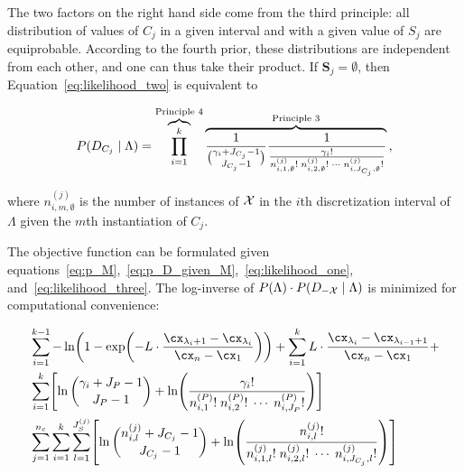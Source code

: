 The two factors on the right hand side come from the third principle: all distribution of values of $C_j$ in a given interval and with a given value of $S_j$ are equiprobable.
According to the fourth prior, these distributions are independent from each other, and one can thus take their product.
If $\bm{S}_j = \emptyset$, then Equation~\ref{eq:likelihood_two} is equivalent to

\begin{equation}
  \label{eq:likelihood_three}
  P(D_{C_j} \mid \Lambda) =
  \overbrace{\prod_{i=1}^{k}}^{\text{Principle 4}}
  \overbrace{{
    {1}\over{
      {\gamma_i + J_{C_j} - 1}\choose{J_{C_j}-1}}
    }
    {{1}\over{
      {{\gamma_i}!} \over {
        {n^{(j)}_{i,1,\emptyset}!} \; {n^{(j)}_{i,2,\emptyset}!} \; \cdots \; {n^{(j)}_{i,J_{C_j},\emptyset} !}
      }
    }
  }}^{\text{Principle 3}}
  \text{,}
\end{equation}

\noindent
where $n^{(j)}_{i,m,\emptyset}$ is the number of instances of $\mathcal{X}$ in the $i$th discretization interval of $\Lambda$ given the $m$th instantiation of $C_j$.

The objective function can be formulated given equations~\ref{eq:p_M},~\ref{eq:p_D_given_M},~\ref{eq:likelihood_one}, and~\ref{eq:likelihood_three}.
The log-inverse of $P(\Lambda) \cdot P(D_{-\mathcal{X}} \mid \Lambda)$ is minimized for computational convenience:

\begin{equation}
\label{eq:opt_prob}
\begin{aligned}
  & \sum_{i=1}^{k-1}
   - \ln
    \paren{
      1 - \exp
      \paren{
        - L \cdot  \frac{
                         \cx_{\lambda_i +1} - \cx_{\lambda_i}
                       }{
                         \cx_n - \cx_1
                        }
      }
    }
      + \sum_{i=1}^{k}
      L \cdot \frac{\cx_{\lambda_{i}} - \cx_{\lambda_{i-1} + 1}}{\cx_n - \cx_1} + \\
  & \sum_{i=1}^{k} \brock{
  \ln{{\gamma_i + J_P - 1}\choose{J_P - 1}}
  +{ \ln \paren{
        \frac{
          {\gamma_i}!
        }{
          {n^{({P})}_{i,1}}! \; {n^{({P})}_{i,2}}! \; \cdots \; {n^{({P})}_{i,J_P}}!
        }
      }}
  } \\
  & \sum_{j=1}^{n_c} \sum_{i=1}^k \sum_{l=1}^{J^{(j)}_S} \brock{
  { \ln
          {{n^{(j)}_{i,l} + J_{C_j} - 1}\choose{J_{C_j}-1}}}
    +
    \ln \paren{ {
          \frac{
            {n^{(j)}_{i,l}}!
          }{
            {n^{(j)}_{i,1,l}!} \; {n^{(j)}_{i,2,l}!} \; \cdots \; {n^{(j)}_{i,J_{C_j},l}!}
          }
        }
        } }
\end{aligned}
\end{equation}

